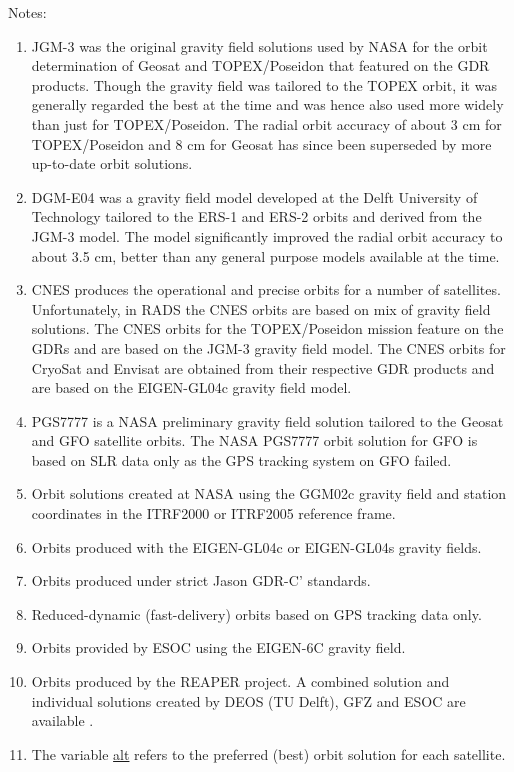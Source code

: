 \documentclass[a4paper,11pt,openany,natbib]{thesis}
\makeatletter
\newcommand\var[1]{\url{#1}\index{variables!#1@\protect\url{#1}}}
\makeatother
\begin{document}
Notes:
\begin{enumerate}
\item JGM-3 was the original gravity field solutions used by NASA for the orbit determination of Geosat and TOPEX/Poseidon that featured on the GDR products. Though the gravity field was tailored to the TOPEX orbit, it was generally regarded the best at the time and was hence also used more widely than just for TOPEX/Poseidon. The radial orbit accuracy of about 3 cm for TOPEX/Poseidon and 8 cm for Geosat has since been superseded by more up-to-date orbit solutions.
\item DGM-E04 was a gravity field model developed at the Delft University of Technology tailored to the ERS-1 and ERS-2 orbits and derived from the JGM-3 model. The model significantly improved the radial orbit accuracy to about 3.5 cm, better than any general purpose models available at the time.
\item CNES produces the operational and precise orbits for a number of satellites. Unfortunately, in RADS the CNES orbits are based on mix of gravity field solutions. The CNES orbits for the TOPEX/Poseidon mission feature on the GDRs and are based on the JGM-3 gravity field model. The CNES orbits for CryoSat and Envisat are obtained from their respective GDR products and are based on the EIGEN-GL04c gravity field model.
\item PGS7777 is a NASA preliminary gravity field solution tailored to the Geosat and GFO satellite orbits. The NASA PGS7777 orbit solution for GFO is based on SLR data only as the GPS tracking system on GFO failed.
\item Orbit solutions created at NASA using the GGM02c gravity field and station coordinates in the ITRF2000 or ITRF2005 reference frame.
\item Orbits produced with the EIGEN-GL04c or EIGEN-GL04s gravity fields.
\item Orbits produced under strict Jason GDR-C' standards.
\item Reduced-dynamic (fast-delivery) orbits based on GPS tracking data only.
\item Orbits provided by ESOC using the EIGEN-6C gravity field.
\item Orbits produced by the REAPER project. A combined solution and individual solutions created by DEOS (TU Delft), GFZ and ESOC are available \citep{rudenko2011}.
\item The variable \var{alt} refers to the preferred (best) orbit solution for each satellite.
\end{enumerate}
\end{document}
